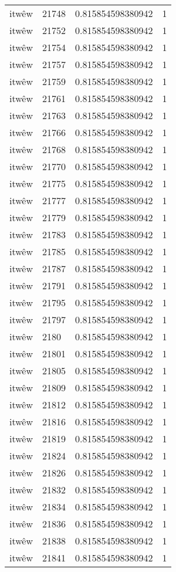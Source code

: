 \begin{longtable}{llll}
itwêw & 21748 & 0.815854598380942 & 1 \\
itwêw & 21752 & 0.815854598380942 & 1 \\
itwêw & 21754 & 0.815854598380942 & 1 \\
itwêw & 21757 & 0.815854598380942 & 1 \\
itwêw & 21759 & 0.815854598380942 & 1 \\
itwêw & 21761 & 0.815854598380942 & 1 \\
itwêw & 21763 & 0.815854598380942 & 1 \\
itwêw & 21766 & 0.815854598380942 & 1 \\
itwêw & 21768 & 0.815854598380942 & 1 \\
itwêw & 21770 & 0.815854598380942 & 1 \\
itwêw & 21775 & 0.815854598380942 & 1 \\
itwêw & 21777 & 0.815854598380942 & 1 \\
itwêw & 21779 & 0.815854598380942 & 1 \\
itwêw & 21783 & 0.815854598380942 & 1 \\
itwêw & 21785 & 0.815854598380942 & 1 \\
itwêw & 21787 & 0.815854598380942 & 1 \\
itwêw & 21791 & 0.815854598380942 & 1 \\
itwêw & 21795 & 0.815854598380942 & 1 \\
itwêw & 21797 & 0.815854598380942 & 1 \\
itwêw & 2180 & 0.815854598380942 & 1 \\
itwêw & 21801 & 0.815854598380942 & 1 \\
itwêw & 21805 & 0.815854598380942 & 1 \\
itwêw & 21809 & 0.815854598380942 & 1 \\
itwêw & 21812 & 0.815854598380942 & 1 \\
itwêw & 21816 & 0.815854598380942 & 1 \\
itwêw & 21819 & 0.815854598380942 & 1 \\
itwêw & 21824 & 0.815854598380942 & 1 \\
itwêw & 21826 & 0.815854598380942 & 1 \\
itwêw & 21832 & 0.815854598380942 & 1 \\
itwêw & 21834 & 0.815854598380942 & 1 \\
itwêw & 21836 & 0.815854598380942 & 1 \\
itwêw & 21838 & 0.815854598380942 & 1 \\
itwêw & 21841 & 0.815854598380942 & 1 \\

\end{longtable}
